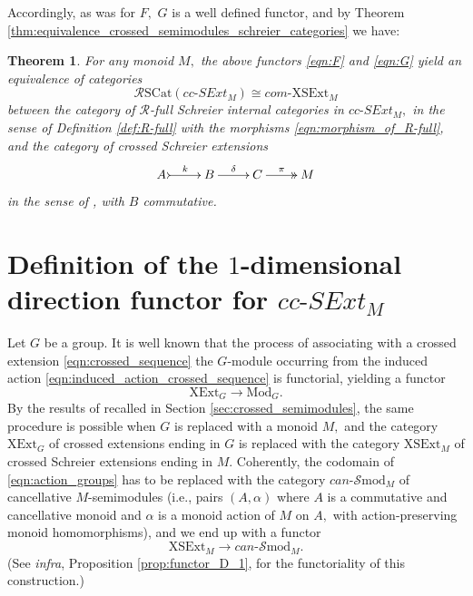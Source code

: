 \documentclass[a4paper]{amsart}
\theoremstyle{plain}
\newtheorem{theorem}[subsection]{Theorem}
\theoremstyle{definition}
\theoremstyle{remark}
\begin{document}
Accordingly, as was for $F,$ $G$ is a well defined functor, and by Theorem \ref{thm:equivalence_crossed_semimodules_schreier_categories} we have:
\begin{theorem}
\label{thm:equivalence_RSCat-XSExt}
For any monoid $M,$ the above functors \eqref{eqn:F} and \eqref{eqn:G} yield an equivalence of categories
\begin{equation*}
\mathcal{R}\mathrm{SCat}(cc\text{-}SExt_M)\cong com\text{-}\mathrm{XSExt}_M
\end{equation*}
between the category of $\mathcal{R}$-full Schreier internal categories in $cc\text{-}SExt_M,$ in the sense of Definition \ref{def:R-full} with the morphisms \eqref{eqn:morphism_of_R-full}, and the category of crossed Schreier extensions
\begin{equation*}
\xymatrix{
A \ar@{>->}[r]^-k &B \ar[r]^-{\delta} &C \ar@{->>}[r]^-{\pi} &M
}
\end{equation*}
in the sense of \cite{AMMPS}, with $B$ commutative.
\end{theorem}
\section{Definition of the $1$-dimensional direction functor for $cc\text{-}SExt_M$}
Let $G$ be a group. It is well known that the process of associating with a crossed extension \eqref{eqn:crossed_sequence} the $G$-module occurring from the induced action \eqref{eqn:induced_action_crossed_sequence} is functorial, yielding a functor
\begin{equation}
\label{eqn:action_groups}
\mathrm{XExt}_G\longrightarrow\mathrm{Mod}_G.
\end{equation}
By the results of \cite{AMMPS} recalled in Section \ref{sec:crossed_semimodules}, the same procedure is possible when $G$ is replaced with a monoid $M,$ and the category $\mathrm{XExt}_G$ of crossed extensions ending in $G$ is replaced with the category $\mathrm{XSExt}_M$ of crossed Schreier extensions ending in $M.$ Coherently, the codomain of \eqref{eqn:action_groups} has to be replaced with the category $can\text{-}\mathcal{S}\mathrm{mod}_M$ of cancellative $M$-semimodules (i.e., pairs $(A,\alpha)$ where $A$ is a commutative and cancellative monoid and $\alpha$ is a monoid action of $M$ on $A,$ with action-preserving monoid homomorphisms), and we end up with a functor
\begin{equation}
\label{eqn:action_monoids}
\mathrm{XSExt}_M\longrightarrow can\text{-}\mathcal{S}\mathrm{mod}_M.
\end{equation}
(See \emph{infra}, Proposition \ref{prop:functor_D_1}, for the functoriality of this construction.)
\end{document}
